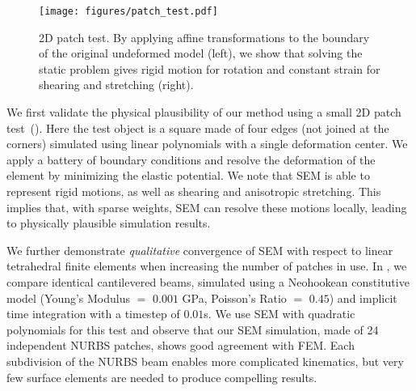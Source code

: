 
\begin{figure}[h]
  \texttt{[image: figures/patch\_test.pdf]}
  \caption{2D patch test. By applying affine transformations to the boundary of the original undeformed model (left), we show that solving the static problem gives rigid motion for rotation and constant strain for shearing and stretching (right).}
  \label{fig:patchtest}
\end{figure}


We first validate the physical plausibility of our method using a small 2D patch test~(). 
Here the test object is a square made of four edges (not joined at the corners) simulated using linear polynomials with a single deformation center.
We apply a battery of boundary conditions and resolve the deformation of the element by minimizing the elastic potential.
We note that SEM is able to represent rigid motions, as well as shearing and anisotropic stretching. 
This implies that, with sparse weights, SEM can resolve these motions locally, leading to physically plausible simulation results.

We further demonstrate \emph{qualitative} convergence of SEM with respect to linear tetrahedral finite elements when increasing the number of patches in use.
In , we compare identical cantilevered beams, simulated using a Neohookean constitutive model (Young's Modulus $=$ $0.001$ GPa, Poisson's Ratio $=$ $0.45$) and implicit time integration with a timestep of $0.01$s. 
We use SEM with quadratic polynomials for this test and observe that our SEM simulation, made of 24 independent NURBS patches, shows good agreement with FEM. Each subdivision of the NURBS beam enables more complicated kinematics, 
but very few surface elements are needed to produce compelling results.

